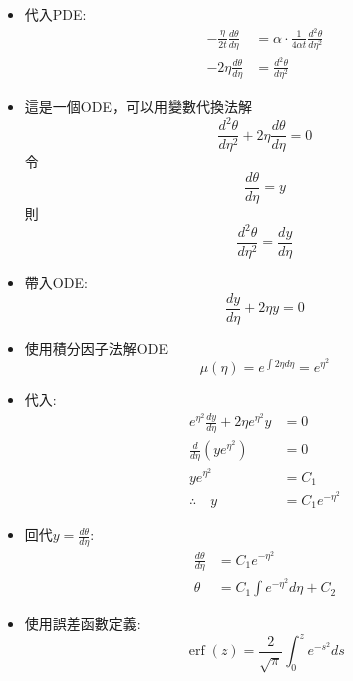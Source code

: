 \documentclass[../main.tex]{subfiles}
\begin{document}
\begin{itemize}
\begin{itemize}
\begin{align}
      \right) = \frac{1}{4 \alpha t} \frac{d^2 \theta}{d\eta^2}
    \end{align}
    \item 代入PDE:
    \begin{align}
      -\frac{\eta}{2t} \frac{d\theta}{d\eta} &= \alpha \cdot \frac{1}{4 \alpha t} \frac{d^2 \theta}{d\eta^2} \nonumber\\
      - 2 \eta \frac{d\theta}{d\eta} &= \frac{d^2 \theta}{d\eta^2}
    \end{align}
    \item 這是一個ODE，可以用變數代換法解
    \begin{equation}
      \frac{d^2 \theta}{d\eta^2} + 2 \eta \frac{d\theta}{d\eta} = 0
    \end{equation}
    令
    \begin{equation}
      \frac{d\theta}{d\eta} = y
    \end{equation}
    則
    \begin{equation}
      \frac{d^2 \theta}{d\eta^2} = \frac{dy}{d\eta}
    \end{equation}
    \item 帶入ODE:
    \begin{equation}
      \frac{dy}{d\eta} + 2 \eta y = 0
    \end{equation}
    \item 使用積分因子法解ODE
    \begin{equation}
      \mu(\eta) = e^{\int 2 \eta d\eta} = e^{\eta^2}
    \end{equation}
    \item 代入:
    \begin{align}
      e^{\eta^2} \frac{dy}{d\eta} + 2 \eta e^{\eta^2} y &= 0 \nonumber\\
      \frac{d}{d\eta} \left(
        y e^{\eta^2}
      \right) &= 0 \nonumber\\
      y e^{\eta^2} &= C_1 \nonumber\\
      \therefore \quad y &= C_1 e^{-\eta^2}
    \end{align}
    \item 回代$y = \frac{d\theta}{d\eta}$:
    \begin{align}
      \frac{d\theta}{d\eta} &= C_1 e^{-\eta^2} \nonumber\\
      \theta &= C_1 \int e^{-\eta^2} d\eta + C_2
    \end{align}
    \item 使用誤差函數定義:
    \begin{equation}
      \operatorname{erf}(z) = \frac{2}{\sqrt{\pi}} \int_0^z e^{-s^2} ds

\end{equation}
\end{itemize}
\end{itemize}
\end{document}

